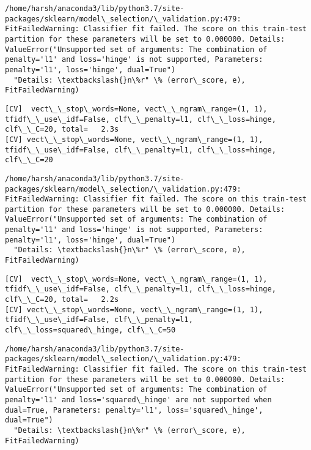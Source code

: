 \documentclass[11pt]{article}
\begin{document}
    \begin{Verbatim}[commandchars=\\\{\}]
/home/harsh/anaconda3/lib/python3.7/site-packages/sklearn/model\_selection/\_validation.py:479: FitFailedWarning: Classifier fit failed. The score on this train-test partition for these parameters will be set to 0.000000. Details: 
ValueError("Unsupported set of arguments: The combination of penalty='l1' and loss='hinge' is not supported, Parameters: penalty='l1', loss='hinge', dual=True")
  "Details: \textbackslash{}n\%r" \% (error\_score, e), FitFailedWarning)

    \end{Verbatim}

    \begin{Verbatim}[commandchars=\\\{\}]
[CV]  vect\_\_stop\_words=None, vect\_\_ngram\_range=(1, 1), tfidf\_\_use\_idf=False, clf\_\_penalty=l1, clf\_\_loss=hinge, clf\_\_C=20, total=   2.3s
[CV] vect\_\_stop\_words=None, vect\_\_ngram\_range=(1, 1), tfidf\_\_use\_idf=False, clf\_\_penalty=l1, clf\_\_loss=hinge, clf\_\_C=20 

    \end{Verbatim}

    \begin{Verbatim}[commandchars=\\\{\}]
/home/harsh/anaconda3/lib/python3.7/site-packages/sklearn/model\_selection/\_validation.py:479: FitFailedWarning: Classifier fit failed. The score on this train-test partition for these parameters will be set to 0.000000. Details: 
ValueError("Unsupported set of arguments: The combination of penalty='l1' and loss='hinge' is not supported, Parameters: penalty='l1', loss='hinge', dual=True")
  "Details: \textbackslash{}n\%r" \% (error\_score, e), FitFailedWarning)

    \end{Verbatim}

    \begin{Verbatim}[commandchars=\\\{\}]
[CV]  vect\_\_stop\_words=None, vect\_\_ngram\_range=(1, 1), tfidf\_\_use\_idf=False, clf\_\_penalty=l1, clf\_\_loss=hinge, clf\_\_C=20, total=   2.2s
[CV] vect\_\_stop\_words=None, vect\_\_ngram\_range=(1, 1), tfidf\_\_use\_idf=False, clf\_\_penalty=l1, clf\_\_loss=squared\_hinge, clf\_\_C=50 

    \end{Verbatim}

    \begin{Verbatim}[commandchars=\\\{\}]
/home/harsh/anaconda3/lib/python3.7/site-packages/sklearn/model\_selection/\_validation.py:479: FitFailedWarning: Classifier fit failed. The score on this train-test partition for these parameters will be set to 0.000000. Details: 
ValueError("Unsupported set of arguments: The combination of penalty='l1' and loss='squared\_hinge' are not supported when dual=True, Parameters: penalty='l1', loss='squared\_hinge', dual=True")
  "Details: \textbackslash{}n\%r" \% (error\_score, e), FitFailedWarning)

    \end{Verbatim}
\end{document}
